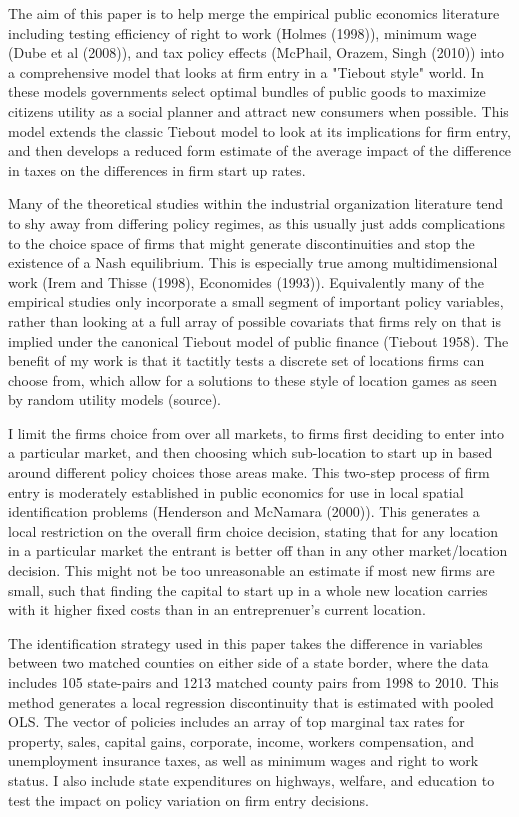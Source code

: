 \documentclass[11pt,a4paper]{article}\usepackage[]{graphicx}\usepackage[]{color}
\begin{document}
The aim of this paper is to help merge the empirical public economics literature including testing efficiency of right to work (Holmes (1998)), minimum wage (Dube et al (2008)), and tax policy effects (McPhail, Orazem, Singh (2010)) into a comprehensive model that looks at firm entry in a "Tiebout style" world. In these models governments select optimal bundles of public goods to maximize citizens utility as a social planner and attract new consumers when possible. This model extends the classic Tiebout model to look at its implications for firm entry, and then develops a reduced form estimate of the average impact of the difference in taxes on the differences in firm start up rates.

Many of the theoretical studies within the industrial organization literature tend to shy away from differing policy regimes, as this usually just adds complications to the choice space of firms that might generate discontinuities and stop the existence of a Nash equilibrium. This is especially true among multidimensional work (Irem and Thisse (1998), Economides (1993)). Equivalently many of the empirical studies only incorporate a small segment of important policy variables, rather than looking at a full array of possible covariats that firms rely on that is implied under the canonical Tiebout model of public finance (Tiebout 1958). The benefit of my work is that it tactitly tests a discrete set of locations firms can choose from, which allow for a solutions to these style of location games as seen by random utility models (source). 

I limit the firms choice from over all markets, to firms first deciding to enter into a particular market, and then choosing which sub-location to start up in based around different policy choices those areas make. This two-step process of firm entry is moderately established in public economics for use in local spatial identification problems (Henderson and McNamara (2000)). This generates a local restriction on the overall firm choice decision, stating that for any location in a particular market the entrant is better off than in any other market/location decision. This might not be too unreasonable an estimate if most new firms are small, such that finding the capital to start up in a whole new location carries with it higher fixed costs than in an entreprenuer's current location.

The identification strategy used in this paper takes the difference in variables between two matched counties on either side of a state border, where the data includes 105 state-pairs and 1213 matched county pairs from 1998 to 2010. This method generates a local regression discontinuity that is estimated with pooled OLS. The vector of policies includes an array of top marginal tax rates for property, sales, capital gains, corporate, income, workers compensation, and unemployment insurance taxes, as well as minimum wages and right to work status. I also include state expenditures on highways, welfare, and education to test the impact on policy variation on firm entry decisions.
\end{document}
